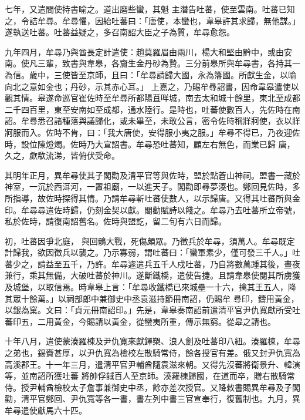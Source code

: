 \begin{pinyinscope}
 七年，又遣間使持書喻之。道出磨些蠻，其魁
 主潛告吐蕃，使至雲南。吐蕃已知之，令詰牟尋。牟尋懼，因紿吐蕃曰：「唐使，本蠻也，韋皋許其求歸，無他謀。」遂執送吐蕃。吐蕃益疑之，多召南詔大臣之子為質，牟尋愈怨。



 九年四月，牟尋乃與酋長定計遣使：趙莫羅眉由兩川，楊大和堅由黔中，或由安南。使凡三輩，致書與韋皋，各齎生金丹砂為贄。三分前皋所與牟尋書，各持其一為信。歲中，三使皆至京師，且曰：「牟尋請歸大國，永為籓國。所獻生金，以喻向北之意如金也；丹砂，示其赤心耳。」
 上嘉之，乃賜牟尋詔書，因命韋皋遣使以觀其情。皋遂命巡官崔佐時至牟尋所都陽苴咩城，南去太和城十餘里，東北至成都二千四百里，東至安南如至成都，通水陸行。是時也，吐蕃使數百人，先佐時在南詔。牟尋悉召諸種落與議歸化，或未畢至，未敢公言，密令佐時稱牂牁使，衣以牂牁服而入。佐時不肯，曰：「我大唐使，安得服小夷之服。」牟尋不得已，乃夜迎佐時，設位陳燈燭。佐時乃大宣詔書。牟尋恐吐蕃知，顧左右無色，而業已歸
 唐，久之，歔欷流涕，皆俯伏受命。



 其明年正月，異牟尋使其子閣勸及清平官等與佐時，盟於點蒼山神祠。盟書一藏於神室，一沉於西洱河，一置祖廟，一以進天子。閣勸即尋夢湊也。鄭回見佐時，多所指導，故佐時探得其情。乃請牟尋斬吐蕃使數人，以示歸唐。又得其吐蕃所與金印。牟尋尋遣佐時歸，仍刻金契以獻。閣勸賦詩以餞之。牟尋乃去吐蕃所立帝號，私於佐時，請復南詔舊名。佐時與盟訖，留二旬有六日而歸。



 初，吐蕃因爭北庭，
 與回鶻大戰，死傷頗眾。乃徵兵於牟尋，須萬人。牟尋既定計歸我，欲因徵兵以襲之。乃示寡弱，謂吐蕃曰：「蠻軍素少，僅可發三千人。」吐蕃少之，請益至五千，乃許。牟尋遽遣兵五千人戍吐蕃，乃自將數萬踵其後，晝夜兼行，乘其無備，大破吐蕃於神川。遂斷鐵橋，遣使告捷。且請韋皋使閱其所虜獲及城堡，以取信焉。時韋皋上言：「牟尋收鐵橋已來城壘一十六，擒其王五人，降其眾十餘萬。」以祠部郎中兼御史中丞袁滋持節冊南詔，仍賜牟
 尋印，鑄用黃金，以銀為窠。文曰：「貞元冊南詔印。」先是，韋皋奏南詔前遣清平官尹仇寬獻所受吐蕃印五，二用黃金，今賜請以黃金，從蠻夷所重，傳示無窮。從皋之請也。



 十年八月，遣使蒙湊羅棟及尹仇寬來獻鐸槊、浪人劍及吐蕃印八紐。湊羅棟，牟尋之弟也，錫賚甚厚，以尹仇寬為檢校左散騎常侍，餘各授官有差。俄又封尹仇寬為高溪郡王。十一年三月，遣清平官尹輔酋隨袁滋來朝。又得先沒蕃將衛景升、韓演等，並南詔所獲吐蕃
 將帥俘馘百人至京師。湊羅棟歸國，在道而卒，贈右散騎常侍。授尹輔酋檢校太子詹事兼御史中丞，餘亦差次授官。又降敕書賜異牟尋及子閣勸，清平官鄭回、尹仇寬等各一書，書左列中書三官宣奉行，復舊制也。九月，異牟尋遣使獻馬六十匹。




\end{pinyinscope}
